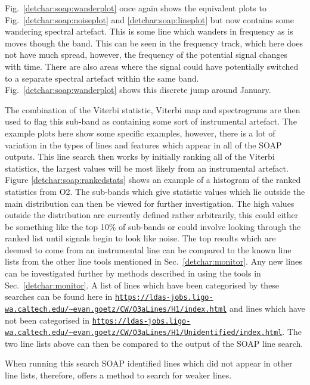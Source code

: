 Fig.~\ref{detchar:soap:wanderplot} once again shows the equivalent plots to Fig.~\ref{detchar:soap:noiseplot} and \ref{detchar:soap:lineplot} but now contains some wandering spectral artefact. 
This is some line which wanders in frequency as is moves though the band. 
This can be seen in the frequency track, which here does not have much spread, however, the frequency of the potential signal changes with time. 
There are also areas where the signal could have potentially switched to a separate spectral artefact within the same band. Fig.~\ref{detchar:soap:wanderplot} shows this discrete jump around January. 

The combination of the Viterbi statistic, Viterbi map and spectrograms are then used to flag this sub-band as containing some sort of instrumental artefact. 
The example plots here show some specific examples, however, there is a lot of variation in the types of lines and features which appear in all of the SOAP outputs.
This line search then works by initially ranking all of the Viterbi statistics, the largest values will be most likely from an instrumental artefact. 
Figure \ref{detchar:soap:rankedstats} shows an example of a histogram of the ranked statistics from O2.
The sub-bands which give statistic values which lie outside the main distribution can then be viewed for further investigation. The high values outside the distribution are currently defined rather arbitrarily, this could either be something like the top 10\% of sub-bands or could involve looking through the ranked list until signals begin to look like noise. 
The top results which are deemed to come from an instrumental line can be compared to the known line lists from the other line tools mentioned in Sec.~\ref{detchar:monitor}.
Any new lines can be investigated further by methods described in \citep{covas2018IdentificationMitigation} using the tools in Sec.~\ref{detchar:monitor}.
A list of lines which have been categorised by these searches can be found here in {\tt \url{https://ldas-jobs.ligo-wa.caltech.edu/~evan.goetz/CW/O3aLines/H1/index.html}} and lines which have not been categorised in {\tt \url{https://ldas-jobs.ligo-wa.caltech.edu/~evan.goetz/CW/O3aLines/H1/Unidentified/index.html}}.
The two line lists above can then be compared to the output of the SOAP line search.


When running this search SOAP identified lines which did not appear in other line lists, therefore, offers a method to search for weaker lines. 


